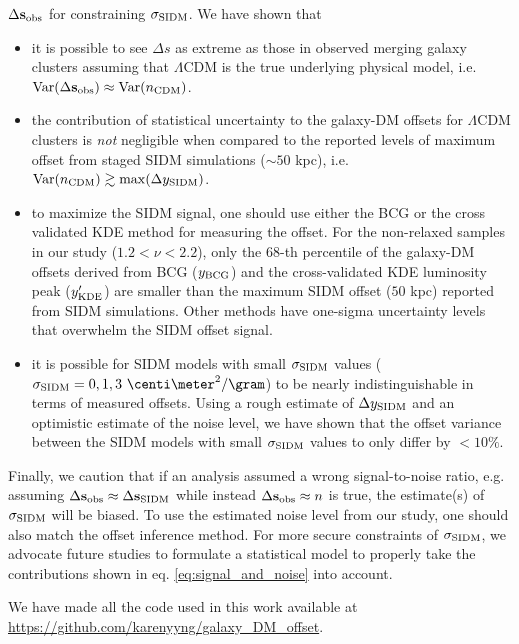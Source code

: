 $\Delta {\bf s}_{\rm obs}$ for constraining $\sigma_{\rm SIDM}$. We have shown that 
\begin{itemize}
		\item it is possible to see $\Delta s$ as extreme as those in observed merging 
			galaxy clusters assuming that $\Lambda$CDM is the true underlying physical model, 
	i.e. $\mathrm{Var}(\Delta {\bf s}_{\rm obs}) \approx \mathrm{Var}(n_{\rm CDM})$.

		\item the contribution of statistical uncertainty to the galaxy-DM offsets 
			for $\Lambda$CDM clusters is {\it not} negligible when compared to the reported  
			levels of maximum offset from staged SIDM simulations ($\sim 50$ kpc),
			i.e. $\mathrm{Var}(n_{\rm CDM}) \gtrsim \max(\Delta y_{{\rm SIDM}})$.
		
		\item to maximize the SIDM signal, one should use either the BCG or the
			cross validated KDE method for measuring the offset.
			For the non-relaxed samples in our study ($1.2 < \nu < 2.2$),
		  only the 68-th percentile of the galaxy-DM offsets derived from BCG ($y_{\rm BCG}$) and 
			the cross-validated KDE luminosity peak	($y_{\rm KDE}'$)
			are smaller than the maximum SIDM offset ($50$ kpc) reported from SIDM simulations. 
			Other methods have one-sigma uncertainty levels that overwhelm the
			SIDM offset signal. 

		\item it is possible for SIDM models with small $\sigma_{\rm SIDM}$ values 
			($\sigma_\SIDM = 0, 1, 3~\centi\meter^2 / \gram$) to be
			nearly indistinguishable in terms of measured offsets. 
			Using a rough estimate of $\Delta y_{\rm SIDM}$ and an optimistic estimate of the
			noise level, we have shown that the offset variance between the
			SIDM models with small $\sigma_{\rm SIDM}$ values to only differ by $< 10\%$.

\end{itemize}
Finally, we caution that if an analysis assumed a wrong signal-to-noise ratio, e.g.
assuming $\Delta {\bf s}_{\rm obs} \approx \Delta {\bf s}_{\rm SIDM}$ while instead $\Delta {\bf s}_{\rm obs}
\approx n$ is true, the estimate(s) of $\sigma_{\rm SIDM}$ will be biased.
To use the estimated noise level from our study, one should also match the
offset inference method.
For more secure constraints of $\sigma_{\rm SIDM}$,
we advocate future studies to formulate a statistical model 
to properly take the contributions shown in eq. \ref{eq:signal_and_noise} into 
account.

We have made all the code used in this work available at \\
\href{https://github.com/karenyyng/galaxy\_DM\_offset}{https://github.com/karenyyng/galaxy\_DM\_offset}.

